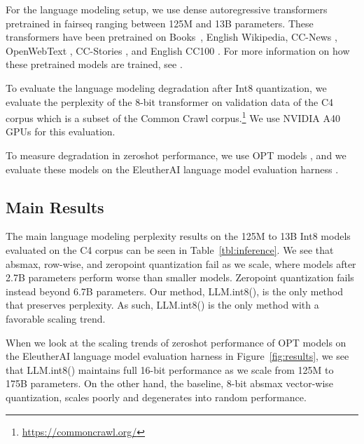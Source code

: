 \documentclass{article}
\begin{document}
For the language modeling setup, we use dense autoregressive transformers pretrained in fairseq \citep{ott2019fairseq} ranging between 125M and 13B parameters. These transformers have been pretrained on Books~\citep{zhu2015aligning}, English Wikipedia, CC-News \citep{nagel2016cc}, OpenWebText \citep{gokaslan2019openwebtext}, CC-Stories \citep{trinh2018simple}, and English CC100 \citep{wenzek-etal-2020-ccnet}. For more information on how these pretrained models are trained, see \citet{artetxe2021efficient}.
 
To evaluate the language modeling degradation after Int8 quantization, we evaluate the perplexity of the 8-bit transformer on validation data of the C4 corpus \citep{raffel2019exploring} which is a subset of the Common Crawl corpus.\footnote{\url{https://commoncrawl.org/}} We use NVIDIA A40 GPUs for this evaluation.

To measure degradation in zeroshot performance, we use OPT models \citep{zhang2022opt}, and we evaluate these models on the EleutherAI language model evaluation harness \citep{eval-harness}.


\subsection{Main Results}

The main language modeling perplexity results on the 125M to 13B Int8 models evaluated on the C4 corpus can be seen in Table~\ref{tbl:inference}. We see that absmax, row-wise, and zeropoint quantization fail as we scale, where models after 2.7B parameters perform worse than smaller models. Zeropoint quantization fails instead beyond 6.7B parameters. Our method, LLM.int8(), is the only method that preserves perplexity. As such, LLM.int8() is the only method with a favorable scaling trend.

When we look at the scaling trends of zeroshot performance of OPT models on the EleutherAI language model evaluation harness in Figure~\ref{fig:results}, we see that LLM.int8() maintains full 16-bit performance as we scale from 125M to 175B parameters. On the other hand, the baseline, 8-bit absmax vector-wise quantization, scales poorly and degenerates into random performance.
\end{document}
